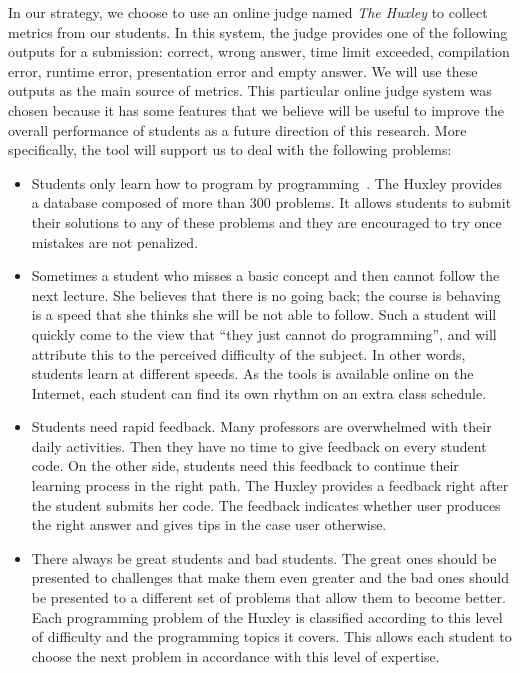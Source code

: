 In our strategy, we choose to use an online judge named \emph{The Huxley} \cite{paes2013ferramenta} to collect metrics from our students. In this system, the judge provides one of the following outputs for a submission: correct, wrong answer, time limit exceeded, compilation error, runtime error, presentation error and empty answer. We will use these outputs as the main source of metrics. This particular online judge system was chosen because it has some features that we believe will be useful to improve the overall performance of students as a future direction of this research. More specifically, the tool will support us to deal with the following problems:
\begin{itemize}
  \item Students only learn how to program by programming~\cite{jenkins-ltsn02}. The Huxley provides a database composed of more than 300 problems. It allows students to submit their solutions to any of these problems and they are encouraged to try once mistakes are not penalized.
  \item Sometimes a student who misses a basic concept and then cannot follow the next lecture. She believes that there is no going back; the course is behaving is a speed that she thinks she will be not able to follow. Such a student will quickly come to the view that ``they just cannot do programming'', and will attribute this to the perceived difficulty of the subject. In other words, students learn at different speeds. As the tools is available online on the Internet, each student can find its own rhythm on an extra class schedule.
  \item Students need rapid feedback. Many professors are overwhelmed with their daily activities. Then they have no time to give feedback on every student code. On the other side, students need this feedback to continue their learning process in the right path. The Huxley provides a feedback right after the student submits her code. The feedback indicates whether user produces the right answer and gives tips in the case user otherwise.
  \item There always be great students and bad students. The great ones should be presented to challenges that make them even greater and the bad ones should be presented to a different set of problems that allow them to become better. Each programming problem of the Huxley is classified according to this level of difficulty and the programming topics it covers. This allows each student to choose the next problem in accordance with this level of expertise.
\end{itemize}

